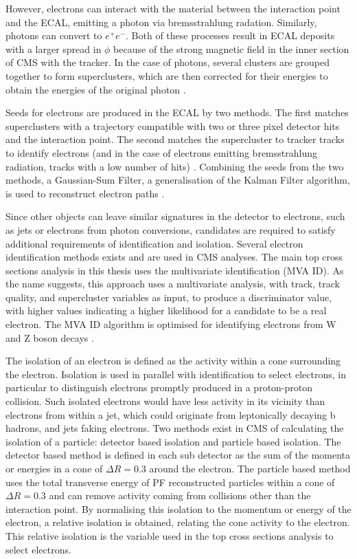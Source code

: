 However, electrons can interact with the material between the interaction point and the ECAL, emitting a
photon via bremsstrahlung radation. Similarly, photons can convert to $e^{+}e^{-}$. Both of these processes
result in ECAL deposits with a larger spread in $\phi$ because of the strong magnetic field in the inner
section of CMS with the tracker. In the case of photons, several clusters are grouped together to form superclusters,
which are then corrected for their energies to obtain the energies of the original photon
\cite{photon_reconstruction}.

Seeds for electrons are produced in the ECAL by two methods. The first matches superclusters with a trajectory
compatible with two or three pixel detector hits and the interaction point. The second matches the
supercluster to tracker tracks to identify electrons (and in the case of electrons emitting bremsstrahlung
radiation, tracks with a low number of hits) \cite{electron_reconstruction}. Combining the seeds from the two
methods, a Gaussian-Sum Filter, a generalisation of the Kalman Filter algorithm, is used to reconstruct
electron paths \cite{electrons_GSF}.

Since other objects can leave similar signatures in the detector to electrons, such as jets or electrons from
photon conversions, candidates are required to satisfy additional requirements of identification and
isolation. Several electron identification methods exists and are used in CMS analyses. The main top cross
sections analysis in this thesis uses the multivariate identification (MVA ID). As the name suggests, this
approach uses a multivariate analysis, with track, track quality, and supercluster variables as input, to
produce a discriminator value, with higher values indicating a higher likelihood for a candidate to be a real
electron. The MVA ID algorithm is optimised for identifying electrons from W and Z boson decays
\cite{electron_reconstruction}.

The isolation of an electron is defined as the activity within a cone surrounding the electron. Isolation is
used in parallel with identification to select electrons, in particular to distinguish electrons promptly
produced in a proton-proton collision. Such isolated electrons would have less activity in its vicinity than
electrons from within a jet, which could originate from leptonically decaying b hadrons, and jets faking
electrons. Two methods exist in CMS of calculating the isolation of a particle: detector based isolation and
particle based isolation. The detector based method is defined in each sub detector as the sum of the momenta
or energies in a cone of $\Delta R = 0.3$ around the electron. The particle based method uses the total
transverse energy of PF reconstructed particles within a cone of $\Delta R = 0.3$ and can remove activity
coming from collisions other than the interaction point. By normalising this isolation to the momentum or
energy of the electron, a relative isolation is obtained, relating the cone activity to the electron. This
relative isolation is the variable used in the top cross sections analysis to select electrons. %

